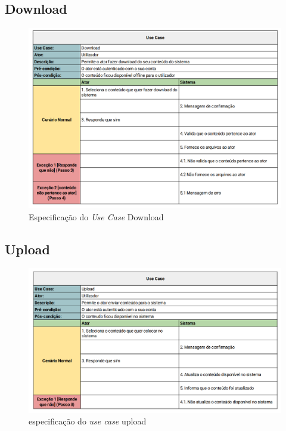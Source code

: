 \documentclass[a4paper]{report}
\begin{document}
\subsection{Download}
\begin{figure}[H]
	\centering 
    \includegraphics[width=\textwidth]{images/Download.png}  
    \caption{Especificação do \emph{Use Case} Download}
\end{figure}

\subsection{Upload}
\begin{figure}[H]
	\centering 
    \includegraphics[width=\textwidth]{images/upload.png}  
    \caption{especificação do \emph{use case} upload}
\end{figure}
\end{document}
